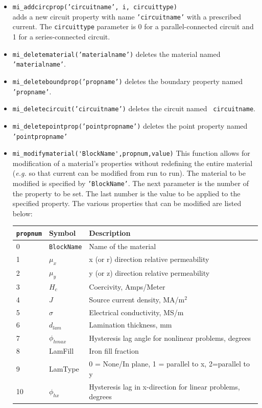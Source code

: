 \begin{itemize}
\item{\tt mi\_addcircprop('circuitname', i, circuittype)} \\
adds a new circuit property with name {\tt 'circuitname'} with a prescribed current.
The {\tt circuittype} parameter is 0 for a parallel-connected circuit and 1 for a
series-connected circuit.
\item{\tt mi\_deletematerial('materialname')} deletes the material named {\tt
'materialname'}.
\item{\tt mi\_deleteboundprop('propname')} deletes the boundary property named
{\tt 'propname'}.
\item{\tt mi\_deletecircuit('circuitname')} deletes the circuit named {\tt
circuitname}.
\item{\tt mi\_deletepointprop('pointpropname')} deletes the point property named
{\tt 'pointpropname'}
\item{\verb+mi_modifymaterial('BlockName',propnum,value)+} This
function allows for modification of a material's properties without
redefining the entire material ({\em e.g.} so that current can be
modified from run to run).  The material to be modified is
specified by {\tt 'BlockName'}.  The next parameter is the number
of the property to be set. The last number is the value to be
applied to the specified property.  The various properties that can
be modified are listed below:
\begin{center}
\begin{tabular}{lll} \hline
{\tt propnum}& Symbol & Description \\ \hline
 0 & {\tt BlockName} & Name of the material \\
 1 & $\mu_x$ & x (or r) direction relative permeability \\
 2 & $\mu_y$ & y (or z) direction relative permeability \\
 3 & $H_c$   & Coercivity, Amps/Meter \\
 4 & $J$   & Source current density, MA/m$^2$ \\
 5 & $\sigma$ & Electrical conductivity, MS/m \\
 6 & $d_{lam}$  & Lamination thickness, mm \\
 7 & $\phi_{hmax}$ & Hysteresis lag angle for nonlinear problems, degrees \\
 8 & LamFill & Iron fill fraction \\
 9 & LamType & 0 = None/In plane, 1 = parallel to x, 2=parallel to y \\
 10 & $\phi_{hx}$ & Hysteresis lag in x-direction for linear problems, degrees \\

\end{tabular}
\end{center}
\end{itemize}
